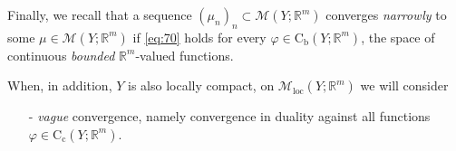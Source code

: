 \documentclass[11pt,reqno]{amsart}
\numberwithin{equation}{section}
\newcommand{\R}{\mathbb{R}}
\newcommand{\calM}{\mathcal{M}}
\theoremstyle{definition}
\newcommand{\Cc}{\mathrm{C}_{\mathrm{c}}}
\newcommand{\Cb}{\mathrm{C}_{\mathrm{b}}}
\newcommand{\frB}{\mathfrak B}
\newcommand{\Mloc}{\mathcal{M}_{\mathrm{loc}}}
\newcommand{\TODO}[1]{\todo[inline, color=cyan!20]{#1}}
\newcommand{\EEE}{\color{black}}
\numberwithin{equation}{section}
\begin{document}
       \EEE
       \par
  Finally, we recall that  a sequence $(\mu_n)_n \subset \calM(Y;\R^m)$ converges \emph{narrowly} to some $\mu \in  \calM(Y;\R^m)$
if \eqref{eq:70} holds for every $\varphi \in \Cb(Y;\R^m)$, the space of continuous \emph{bounded} $\R^m$-valued functions. 
  \par
  When, in addition, $Y$ is also locally compact, on
$\Mloc(Y;\R^m)$ we will consider
\begin{itemize}
\item[-] \emph{vague} convergence, namely convergence in duality against  all functions  $\varphi \in \Cc(Y;\R^m)$. 
\end{itemize}



\end{document}
